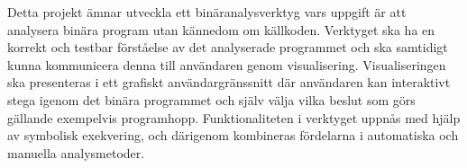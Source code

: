 Detta projekt ämnar utveckla ett binäranalysverktyg vars uppgift är att
analysera binära program utan kännedom om källkoden. Verktyget ska ha en korrekt
och testbar förståelse av det analyserade programmet och ska samtidigt kunna
kommunicera denna till användaren genom visualisering. Visualiseringen ska
presenteras i ett grafiskt användargränssnitt där användaren kan interaktivt
stega igenom det binära programmet och själv välja vilka beslut som görs 
gällande exempelvis programhopp. Funktionaliteten i verktyget uppnås med hjälp
av symbolisk exekvering, och därigenom kombineras fördelarna i automatiska och 
manuella analysmetoder.


